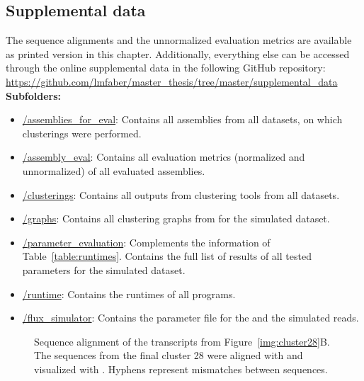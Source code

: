 \documentclass[12pt,a4paper,english]{article}
\begin{document}
\subsection{Supplemental data}
\label{appendix:supplements}
The sequence alignments and the unnormalized evaluation metrics are available as printed version in this chapter. Additionally, everything else can be accessed through the online supplemental data in the following GitHub repository:\\
\href{https://github.com/lmfaber/master_thesis/tree/master/supplemental_data}{https://github.com/lmfaber/master\_thesis/tree/master/supplemental\_data}\\
\textbf{Subfolders:}
\begin{itemize}
	\item \href{https://github.com/lmfaber/master_thesis/tree/master/supplemental_data/assemblies_for_eval}{/assemblies\_for\_eval}: Contains all assemblies from all datasets, on which clusterings were performed.
	\item \href{https://github.com/lmfaber/master_thesis/tree/master/supplemental_data/assembly_eval}{/assembly\_eval}: Contains all evaluation metrics (normalized and unnormalized) of all evaluated assemblies.
	\item \href{https://github.com/lmfaber/master_thesis/tree/master/supplemental_data/clusterings}{/clusterings}: Contains all outputs from clustering tools from all datasets.
	\item \href{https://github.com/lmfaber/master_thesis/tree/master/supplemental_data/graphs}{/graphs}: Contains all clustering graphs from \karma for the simulated \celegans dataset.
	\item \href{https://github.com/lmfaber/master_thesis/tree/master/supplemental_data/parameter\_evaluation}{/parameter\_evaluation}: Complements the information of Table~\ref{table:runtimes}. Contains the full list of results of all tested parameters for the simulated \celegans dataset.
	\item \href{https://github.com/lmfaber/master_thesis/tree/master/supplemental_data/runtime}{/runtime}: Contains the runtimes of all programs.
	\item \href{https://github.com/lmfaber/master_thesis/tree/master/supplemental_data/flux_simulator}{/flux\_simulator}: Contains the parameter file for the \flux and the simulated reads.

\end{itemize}


\begin{figure}
	\centering
	\def\svgwidth{\textwidth}
	
	\caption[Sequence alignment of the transcripts from Figure~\ref{img:cluster28}B.]{Sequence alignment of the transcripts from Figure~\ref{img:cluster28}B. The sequences from the final cluster 28 were aligned with \muscle \citep{muscle:04} and visualized with \jalview \citep{jalview:09}. Hyphens represent mismatches between sequences.}
	\label{img:aln:case1}
\end{figure}
\end{document}

